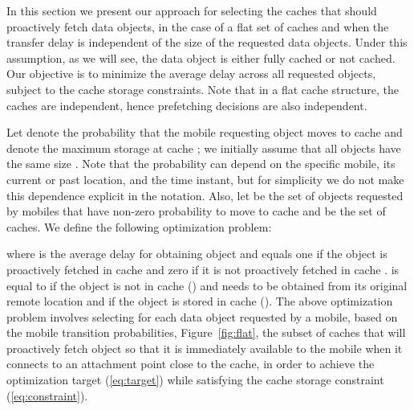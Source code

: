 \documentclass[conference]{IEEEtran}
\newcommand{\mynote}[1]{{{\medskip
\footnotesize \em \noindent Note: #1}}\medskip}
\renewcommand{\mynote}[1]{}
\begin{document}
\mynote{
Key points:
\begin{itemize}
\item Simple decision function for each request/at each cache. This decision function can be applied at mobile device/user or cache. Depending on where the decision is taken, we might need to communicate information on the transition probabilities.
\item Distributed. Decision for each request and each cache can be taken independently.
\item cache price is a congestion price that is updated based on demand. This is a new contribution related to previous proposals.
\item Problem is difficult with different object sizes. Our approach can handle different object sizes.
\item Be careful with use of data object and mobile.
\end{itemize}

}

In this section we present our approach for  selecting the caches that should proactively fetch data objects, in the case of a flat set of caches and when the transfer delay is independent of the size of the requested data objects. Under this assumption, as we will see, the data object is either fully cached or not cached.
Our objective is to minimize the average delay across all requested objects, subject to the cache storage constraints.
Note that in a flat cache structure, the caches are independent, hence prefetching decisions are also independent.

Let  denote the probability that the mobile requesting object  moves to cache  and  denote the maximum storage at cache ; we initially assume that all objects have the same size .
Note that the probability  can depend on the specific mobile, its current or past location, and the time instant, but for simplicity we do not make this dependence explicit in the notation.
Also, let  be the set of objects requested by mobiles that have non-zero probability to move to cache  and  be the set of caches. We define the following optimization problem:

where  is the average delay for obtaining object  and  equals one if the object  is proactively fetched in cache  and zero if it is not proactively fetched in cache .
 is equal to   if the object is not in cache  () and needs to be obtained from its original remote location and  if the object is stored in  cache  ().
The above optimization problem involves selecting  for each data object  requested by a mobile, based on the mobile transition probabilities, Figure~\ref{fig:flat}, the subset  of caches that will proactively fetch object  so that it is immediately available to the mobile when it connects to an attachment point close to the cache, in order to achieve the optimization target (\ref{eq:target})  while satisfying the cache storage constraint (\ref{eq:constraint}).
\end{document}
